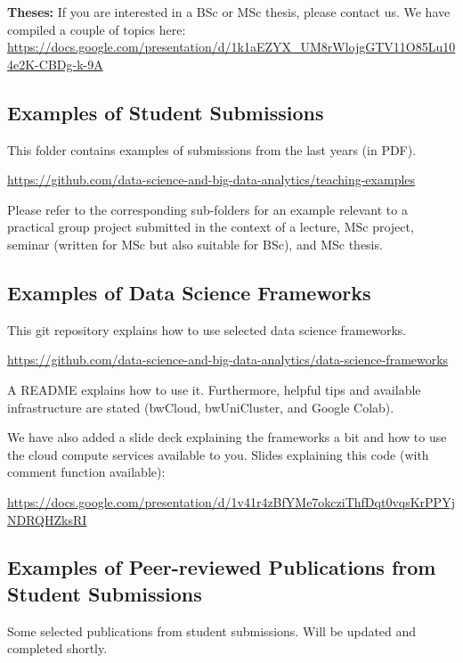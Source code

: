 \documentclass[manuscript, nonacm]{acmart}
\begin{document}
\textbf{Theses:}
If you are interested in a BSc or MSc thesis, please contact us. 
We have compiled a couple of topics here:
\url{https://docs.google.com/presentation/d/1k1aEZYX_UM8rWlojgGTV11O85Lu104e2K-CBDg-k-9A}



\subsection{Examples of Student Submissions}

This folder contains examples of submissions from the last years (in PDF). 

\url{https://github.com/data-science-and-big-data-analytics/teaching-examples}

Please refer to the corresponding sub-folders for an example relevant to a practical group project submitted in the context of a lecture, MSc project, seminar (written for MSc but also suitable for BSc), and MSc thesis.



\subsection{Examples of Data Science Frameworks}

This git repository explains how to use selected data science frameworks. 

\url{https://github.com/data-science-and-big-data-analytics/data-science-frameworks}

A README explains how to use it.
Furthermore, helpful tips and available infrastructure are stated (bwCloud, bwUniCluster, and Google Colab).

We have also added a slide deck explaining the frameworks a bit and how to use the cloud compute services available to you.
Slides explaining this code (with comment function available):

\url{https://docs.google.com/presentation/d/1v41r4zBfYMe7okcziThfDqt0vqsKrPPYjNDRQHZksRI}


\subsection{Examples of Peer-reviewed Publications from Student Submissions}

Some selected publications from student submissions.
Will be updated and completed shortly.
\end{document}
